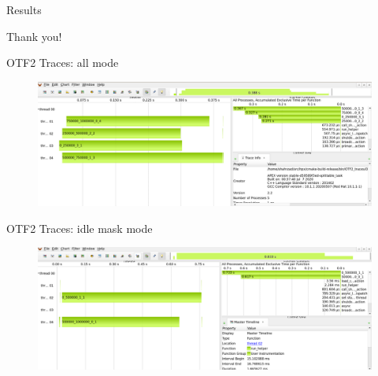 \documentclass[10pt]{beamer}
\begin{document}
\begin{frame}{Results}
\begin{outline}
\begin{figure}[H]
			\hfill
	
			\caption{}
			\label{fig10}
		\end{figure}
		\end{outline}
	\end{frame}

\begin{frame}[standout]
  Thank you!
\end{frame}

\begin{frame}{OTF2 Traces: all mode}
		\begin{figure}[]
		\includegraphics[width=0.99\linewidth]{images/splittable/traces/all_1000000_4.png}
		\caption{}
	\end{figure}	
\end{frame}

\begin{frame}{OTF2 Traces: idle mask mode}
	\begin{figure}[]
		\includegraphics[width=0.99\linewidth]{images/splittable/traces/idle_mask_1000000_4.png}
		\caption{}
	\end{figure}	
\end{frame}
\end{document}
